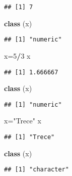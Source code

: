 \documentclass[
]{book}
\newenvironment{Shaded}{\begin{snugshade}}{\end{snugshade}}
\newcommand{\DecValTok}[1]{\textcolor[rgb]{0.00,0.00,0.81}{#1}}
\newcommand{\FunctionTok}[1]{\textcolor[rgb]{0.13,0.29,0.53}{\textbf{#1}}}
\newcommand{\NormalTok}[1]{#1}
\newcommand{\OtherTok}[1]{\textcolor[rgb]{0.56,0.35,0.01}{#1}}
\newcommand{\SpecialCharTok}[1]{\textcolor[rgb]{0.81,0.36,0.00}{\textbf{#1}}}
\newcommand{\StringTok}[1]{\textcolor[rgb]{0.31,0.60,0.02}{#1}}
\begin{document}
\begin{verbatim}
## [1] 7
\end{verbatim}

\begin{Shaded}
\begin{Highlighting}[]
\FunctionTok{class}\NormalTok{ (x)}
\end{Highlighting}
\end{Shaded}

\begin{verbatim}
## [1] "numeric"
\end{verbatim}

\begin{Shaded}
\begin{Highlighting}[]
\NormalTok{x}\OtherTok{=}\DecValTok{5}\SpecialCharTok{/}\DecValTok{3}
\NormalTok{x}
\end{Highlighting}
\end{Shaded}

\begin{verbatim}
## [1] 1.666667
\end{verbatim}

\begin{Shaded}
\begin{Highlighting}[]
\FunctionTok{class}\NormalTok{ (x)}
\end{Highlighting}
\end{Shaded}

\begin{verbatim}
## [1] "numeric"
\end{verbatim}

\begin{Shaded}
\begin{Highlighting}[]
\NormalTok{x}\OtherTok{=}\StringTok{"Trece"}
\NormalTok{x}
\end{Highlighting}
\end{Shaded}

\begin{verbatim}
## [1] "Trece"
\end{verbatim}

\begin{Shaded}
\begin{Highlighting}[]
\FunctionTok{class}\NormalTok{ (x)}
\end{Highlighting}
\end{Shaded}

\begin{verbatim}
## [1] "character"
\end{verbatim}
\end{document}
